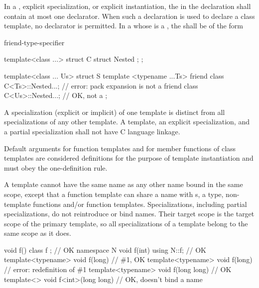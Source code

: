 \pnum
In a
,
explicit specialization, or explicit instantiation, the
in the declaration shall contain at most one declarator.
When such a declaration is used to declare a class template,
no declarator is permitted.
In a 
whose  is a ,
the  shall be of the form
\begin{ncsimplebnf}
 friend-type-specifier \terminal{;}
\end{ncsimplebnf}
\begin{example}
\begin{codeblock}
template<class ...>
struct C {
  struct Nested { };
};

template<class ... Us>
struct S {
  template <typename ...Ts>
  friend class C<Ts>::Nested...;        // error: pack expansion is not a 
  friend class C<Us>::Nested...;        // OK, not a 
};
\end{codeblock}
\end{example}

\pnum
{}%
A specialization (explicit or implicit) of one template is
distinct from all specializations of any other template.
A template, an explicit specialization, and a
partial specialization shall not have C language linkage.
\begin{note}
Default arguments for function templates and for member functions of
class templates are considered definitions for the purpose of template
instantiation and must obey the one-definition rule.
\end{note}

\pnum
\begin{note}
A template cannot have the same name as any other
name bound in the same scope, except
that a function template can share a name with s,
a type, non-template functions and/or function templates.
Specializations, including partial specializations,
do not reintroduce or bind names.
Their target scope is the target scope of the primary template,
so all specializations of a template belong to the same scope as it does.
\begin{example}
\begin{codeblock}
void f() {}
class f {};                                     // OK
namespace N {
  void f(int) {}
}
using N::f;                                     // OK
template<typename> void f(long) {}              // \#1, OK
template<typename> void f(long) {}              // error: redefinition of \#1
template<typename> void f(long long) {}         // OK
template<>         void f<int>(long long) {}    // OK, doesn't bind a name
\end{codeblock}
\end{example}
\end{note}

